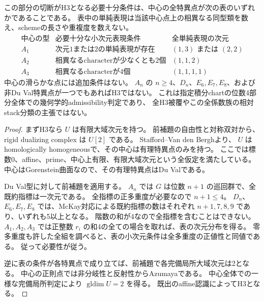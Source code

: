 \begin{theorem}[位数4積分部分の必要十分な幾何学的判定]
\label{thm:order4-sector-admissibility}
この部分の切断がH3となる必要十分条件は、中心の全特異点が次の表のいずれかであることである。
表中の単純表現は当該中心点上の相異なる同型類を数え、schemeの長さや重複度を数えない。
\[
\begin{array}{c|c|c}
 \text{中心の型}&\text{必要十分な小次元表現条件}&\text{全単純表現の次元}\\\hline
 A_1&\text{次元1または2の単純表現が存在}&(1,3)\text{ または }(2,2)\\
 A_2&\text{相異なるcharacterが少なくとも2個}&(1,1,2)\\
 A_3&\text{相異なるcharacterが4個}&(1,1,1,1)
\end{array}
\]
中心の滑らかな点には追加条件はない。
$A_n$ の $n\ge4$、$D_n$、$E_6,E_7,E_8$、および非Du Val特異点が一つでもあればH3ではない。
これは指定積分chartの位数4部分全体での幾何学的admissibility判定であり、
全H3被覆やこの全係数族の相対stack分類の主張ではない。
\end{theorem}
\begin{proof}
まずH3なら $U$ は有限大域次元を持つ。
前補題の自由性と対称双対から、rigid dualizing complex は $U[2]$ である。
Stafford--Van den Bergh\cite[Proposition 2.6, Theorem 4.3]{SVdBRational}より、
$U$ はhomologically homogeneousで、その中心は有理特異点のみを持つ。
ここでは標数0、affine、prime、中心上有限、有限大域次元という全仮定を満たしている。
中心はGorenstein曲面なので、その有理特異点はDu Valである\cite[Theorem (0.3)]{ReidCanonicalSurface}。

Du Val型に対して前補題を適用する。
$A_n$ では $G$ は位数 $n+1$ の巡回群で、全既約指標は一次元である。
全指標の正多重度が必要なので $n+1\le4$。
$D_n$、$E_6,E_7,E_8$ では、McKay対応\cite[\S5.2]{CBMcKayNotes}による既約指標の数はそれぞれ
$n+1,7,8,9$ であり、いずれも5以上となる。
階数の和が4なので全指標を含むことはできない。
$A_1,A_2,A_3$ では正整数 $r_i$ の和4の全ての場合を取れば、表の次元分布を得る。
零多重度も許した全組を調べると、表の小次元条件は全多重度の正値性と同値である。
従って必要性が従う。

逆に表の条件が各特異点で成り立てば、前補題で各完備局所大域次元は2となる。
中心の正則点では非分岐性と反射性からAzumayaである。
中心全体での一様な完備局所判定により $\operatorname{gldim}U=2$ を得る。
既出のaffine認識によってH3となる。
\end{proof}

